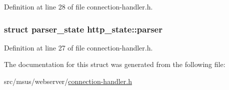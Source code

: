 Definition at line 28 of file connection-\/handler.\-h.

\hypertarget{structhttp__state_a3eda42ab7c2b2dfbc61a1cc5eb076555}{
\subsubsection[{parser}]{\setlength{\rightskip}{0pt plus 5cm}struct {\bf parser\-\_\-state} http\-\_\-state\-::parser}}\label{structhttp__state_a3eda42ab7c2b2dfbc61a1cc5eb076555}


Definition at line 27 of file connection-\/handler.\-h.



The documentation for this struct was generated from the following file\-:\begin{DoxyCompactItemize}
\item 
src/msus/webserver/\hyperlink{connection-handler_8h}{connection-\/handler.\-h}\end{DoxyCompactItemize}
